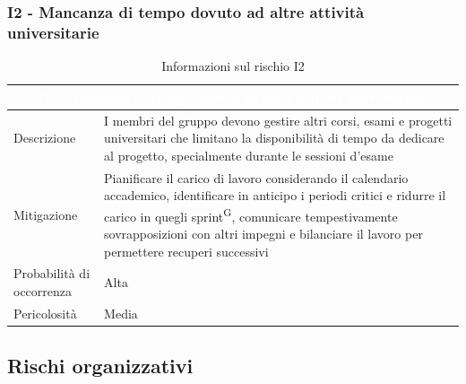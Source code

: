 \documentclass[a4paper, 11pt]{article}
\begin{document}
\subsubsection{I2 - Mancanza di tempo dovuto ad altre attività universitarie}
\begin{table}[H]
    \centering
    \begin{tabular}{|p{}|p{}|}
    	\hline
    	\multicolumn{2}{|c|}{\cellcolor{AccentColor}\textcolor{white}{\textbf{I2 - Mancanza di tempo dovuto ad altre attività universitarie}}} \\ 
        \hline
        Descrizione & I membri del gruppo devono gestire altri corsi, esami e progetti universitari che limitano la disponibilità di tempo da dedicare al progetto, specialmente durante le sessioni d'esame \\ 
        \hline
        Mitigazione & Pianificare il carico di lavoro considerando il calendario accademico, identificare in anticipo i periodi critici e ridurre il carico in quegli sprint\textsuperscript{G}, comunicare tempestivamente sovrapposizioni con altri impegni e bilanciare il lavoro per permettere recuperi successivi \\ 
        \hline
        Probabilità di occorrenza & Alta \\
        \hline
        Pericolosità & Media \\
        \hline
    \end{tabular}
    \caption{Informazioni sul rischio I2}
\end{table}

\subsection{Rischi organizzativi}
\end{document}
